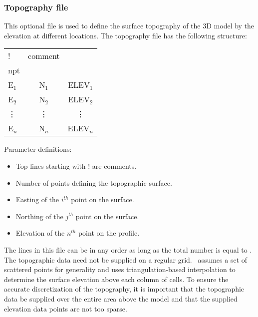 
\subsubsection{Topography file}
This optional file is used to define the surface topography of the 3D model by the elevation at different locations. The topography file has the following structure:
%
\begin{fileExample}
\begin{tabular}{|lcc|}
\hline
! & comment & \\
npt & & \\
E$_1$ & N$_1$ & ELEV$_1$ \\
E$_2$ & N$_2$ & ELEV$_2$ \\
\vdots & \vdots & \vdots \\
E$_n$ & N$_n$ & ELEV$_n$ \\
\hline
\end{tabular}
\end{fileExample}
%
Parameter definitions:
\begin{itemize}
\item[\codeName{!}] Top lines starting with ! are comments.
\item[\codeName{npt}] Number of points defining the topographic surface.
\item[\codeName{E$_i$}] Easting of the $i^{th}$  point on the surface.
\item[\codeName{N$_j$}] Northing of the $j^{th}$  point on the surface.
\item[\codeName{ELEV$_n$}] Elevation of the $n^{th}$  point on the profile.
\end{itemize}
%
The lines in this file can be in any order as long as the total number is equal to . The topographic data need not be supplied on a regular grid. \prog ~assumes a set of scattered points for generality and uses triangulation-based interpolation to determine the surface elevation above each column of cells. To ensure the accurate discretization of the topography, it is important that the topographic data be supplied over the entire area above the model and that the supplied elevation data points are not too sparse.

